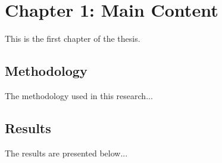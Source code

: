 \section{Chapter 1: Main Content}

This is the first chapter of the thesis.

\subsection{Methodology}
The methodology used in this research...

\subsection{Results}
The results are presented below...
